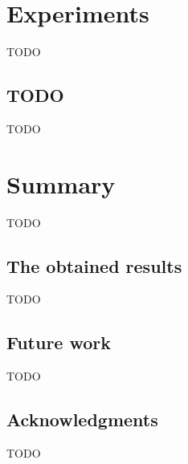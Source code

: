 \documentclass[longabstract, english, mgr]{iithesis}
\newcommand\numberedchapter[1]{\setlength\topskip{3cm}\chapter{#1}\setlength\topskip{0cm}}
\theoremstyle{default_theorem_style}\newtheorem{theorem}{Theorem}
\theoremstyle{default_theorem_style}\newtheorem{definition}{Definition}
\begin{document}
\numberedchapter{Experiments}

TODO

\section{TODO}

TODO

\numberedchapter{Summary}

TODO

\section{The obtained results}

TODO

\section{Future work}

TODO

\section{Acknowledgments}

TODO
\end{document}
